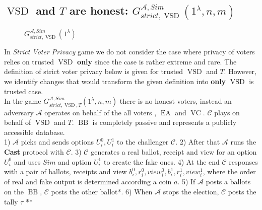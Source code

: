 \documentclass[12pt]{article}
\DeclareMathOperator{\vsd}{VSD}
\DeclareMathOperator{\ea}{EA}
\DeclareMathOperator{\bb}{BB}
\DeclareMathOperator{\voc}{VC}
\begin{document}
\subsection{$\vsd$ and $T$ are honest: $G_{strict,\vsd}^{\mathcal{A},Sim}(1^{\lambda},n,m)$}
  \begin{figure}[h!]
 
        \caption{ $G_{strict,\vsd}^{\mathcal{A},Sim}(1^{\lambda})$}
        \label{VSD is honest}
\end{figure}

In \textit{Strict Voter Privacy} game we do not consider the case where privacy of voters relies on trusted $\vsd$ \textbf{only} since the case is rather extreme and rare. The definition of strict voter privacy below is given for trusted $\vsd$ and $T$. However, we identify changes that would transform the given definition into \textbf{only} $\vsd$ is trusted case.\\

 In the game $G_{strict,\vsd,T}^{\mathcal{A}, Sim}(1^{\lambda},n,m)$ there is no honest voters, instead an adversary $\mathcal{A}$ operates on behalf of the all voters , $\ea$ and $\voc$.  $\mathcal{C}$ plays on behalf of $\vsd$ and $T$.  $\bb$ is completely passive and represents a publicly accessible database.\\
 
 1)  $\mathcal{A}$ picks and sends options $U_i^0, U_i^1$ to the challenger $\mathcal{C}$. 2) After that $\mathcal{A}$ runs the \textbf{Cast} protocol with $\mathcal{C}$. 3) $\mathcal{C}$ generates a real ballot, receipt and view for an option $U_i^0$ and uses $Sim$ and option $U_i^1$ to create the fake ones.  4) At the end $\mathcal{C}$ responses with a pair of ballots, receipts and view $b_i^0,r_i^0,view_i^0,b_i^1,r_i^1,view_i^1$, where the order of real and fake output is determined according a coin $a$. 5) If $\mathcal{A}$ posts a ballots on the $\bb$, $\mathcal{C}$ posts the other ballot*. 6)  When $\mathcal{A}$ stops the election, $\mathcal{C}$ posts the tally $\tau$ ** \\
\end{document}
